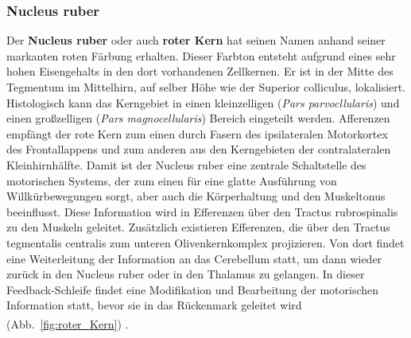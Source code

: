 \documentclass[12pt,a4paper,pdftex]{article}
\begin{document}
\subsubsection*{Nucleus ruber} 
Der \textbf{Nucleus ruber} oder auch \textbf{roter Kern} hat seinen Namen anhand seiner markanten roten Färbung erhalten. Dieser Farbton entsteht aufgrund eines sehr hohen Eisengehalts in den dort vorhandenen Zellkernen. Er ist in der Mitte des Tegmentum im Mittelhirn, auf selber Höhe wie der Superior colliculus, lokalisiert. Histologisch kann das Kerngebiet in einen kleinzelligen (\textit{Pars parvocllularis}) und einen großzelligen (\textit{Pars magnocellularis}) Bereich eingeteilt werden. Afferenzen empfängt der rote Kern zum einen durch Fasern des ipsilateralen Motorkortex des Frontallappens und zum anderen aus den Kerngebieten der contralateralen Kleinhirnhälfte. Damit ist der Nucleus ruber eine zentrale Schaltstelle des motorischen Systems, der zum einen für eine glatte Ausführung von Willkürbewegungen sorgt, aber auch die Körperhaltung und den Muskeltonus beeinflusst. Diese Information wird in Efferenzen über den Tractus rubrospinalis zu den Muskeln geleitet. Zusätzlich existieren Efferenzen, die über den Tractus tegmentalis centralis zum unteren Olivenkernkomplex projizieren. Von dort findet eine Weiterleitung der Information an das Cerebellum statt, um dann wieder zurück in den Nucleus ruber oder in den Thalamus zu gelangen. In dieser Feedback-Schleife findet eine Modifikation und Bearbeitung der motorischen Information statt, bevor sie in das Rückenmark geleitet wird (Abb.~\ref{fig:roter_Kern}) \textsuperscript{\cite[6]{trepel2011neuroanatomie}}. 
\end{document}
